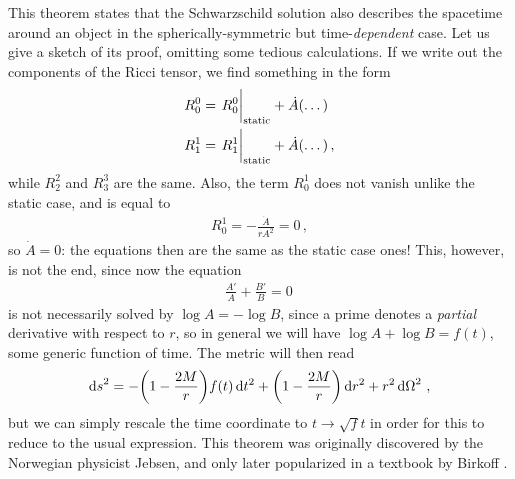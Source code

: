 \documentclass[main.tex]{subfiles}
\begin{document}
This theorem states that the Schwarzschild solution also describes the spacetime around an object in the spherically-symmetric but time-\emph{dependent} case. Let us give a sketch of its proof, omitting some tedious calculations. 
If we write out the components of the Ricci tensor, we find something in the form 
%
\begin{align}
R^{0}_{0} &= \eval{R^{0}_{0}}_{\text{static}} + \dot{A} \qty(\dots)\\
R^{1}_{1} &= \eval{R^{1}_{1}}_{\text{static}} + \dot{A} \qty(\dots)
\,,
\end{align}
%
while \(R^{2}_{2}\) and \(R^{3}_{3}\) are the same. Also, the term \(R^{1}_{0}\) does not vanish unlike the static case, and is equal to 
%
\begin{align}
R^{1}_{0} = - \frac{\dot{A}}{r A^2} = 0
\,,
\end{align}
%
so \(\dot{A} = 0\): the equations then are the same as the static case ones!
This, however, is not the end, since now the equation 
%
\begin{align}
\frac{A'}{A} + \frac{B'}{B} = 0
\,
\end{align}
%
is not necessarily solved by \(\log A = - \log B\), since a prime denotes a \emph{partial} derivative with respect to \(r\), so in general we will have \(\log A + \log B = f(t)\), some generic function of time. 
The metric will then read 
%
\begin{align}
\dd{s}^2 = - \qty(1 - \frac{2M}{r}) f(t)\dd{t^2} + \qty(1 - \frac{2M}{r}) \dd{r^2} + r^2 \dd{\Omega}^2
\,,
\end{align}
%
but we can simply rescale the time coordinate to \(t \to \sqrt{f} t\) in order for this to reduce to the usual expression.
This theorem was originally discovered by the Norwegian physicist Jebsen, and only later popularized in a textbook by Birkoff \cite{johansenDiscoveryBirkhoffTheorem2005}. 
\end{document}
